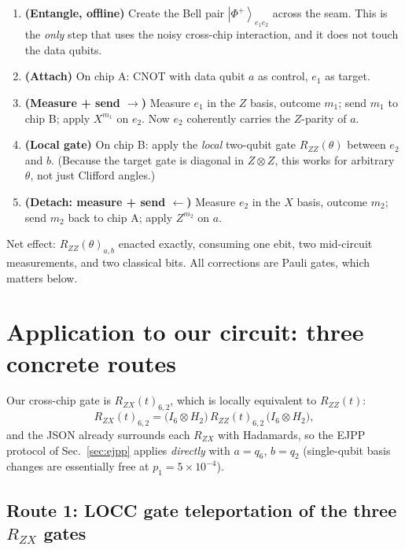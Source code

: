 \documentclass[11pt]{article}
\newcommand{\ket}[1]{\left|#1\right\rangle}
\newcommand{\RZX}{R_{ZX}}
\newcommand{\RZZ}{R_{ZZ}}
\begin{document}
\begin{enumerate}[leftmargin=2em]
  \item \textbf{(Entangle, offline)} Create the Bell pair $\ket{\Phi^+}_{e_1 e_2}$
        across the seam. This is the \emph{only} step that uses the noisy
        cross-chip interaction, and it does not touch the data qubits.
  \item \textbf{(Attach)} On chip A: CNOT with data qubit $a$ as control,
        $e_1$ as target.
  \item \textbf{(Measure + send $\rightarrow$)} Measure $e_1$ in the $Z$ basis,
        outcome $m_1$; send $m_1$ to chip B; apply $X^{m_1}$ on $e_2$. Now
        $e_2$ coherently carries the $Z$-parity of $a$.
  \item \textbf{(Local gate)} On chip B: apply the \emph{local} two-qubit gate
        $\RZZ(\theta)$ between $e_2$ and $b$. (Because the target gate is
        diagonal in $Z\otimes Z$, this works for arbitrary $\theta$, not just
        Clifford angles.)
  \item \textbf{(Detach: measure + send $\leftarrow$)} Measure $e_2$ in the $X$
        basis, outcome $m_2$; send $m_2$ back to chip A; apply $Z^{m_2}$ on $a$.
\end{enumerate}

Net effect: $\RZZ(\theta)_{a,b}$ enacted exactly, consuming one ebit, two
mid-circuit measurements, and two classical bits. All corrections are Pauli
gates, which matters below.

\section{Application to our circuit: three concrete routes}
\label{sec:application}

Our cross-chip gate is $\RZX(t)_{6,2}$, which is locally equivalent to
$\RZZ(t)$:
\[
\RZX(t)_{6,2} = \big(I_6 \otimes H_2\big)\,
\RZZ(t)_{6,2}\,\big(I_6 \otimes H_2\big),
\]
and the JSON already surrounds each $\RZX$ with Hadamards, so the EJPP
protocol of Sec.~\ref{sec:ejpp} applies \emph{directly} with $a = q_6$,
$b = q_2$ (single-qubit basis changes are essentially free at
$p_1 = 5\times10^{-4}$).

\subsection{Route 1: LOCC gate teleportation of the three $\RZX$ gates}
\end{document}
